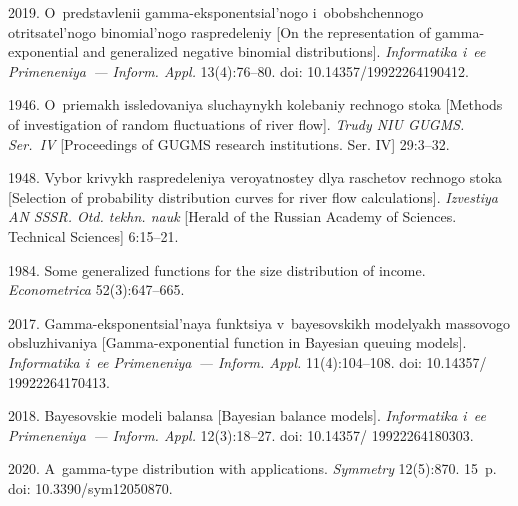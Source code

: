   \begin{multicols}{2}

\renewcommand{\bibname}{\protect\rmfamily References}

{\small\frenchspacing
 {%
 \begin{thebibliography}{99} 

 2019. O~pred\-stav\-le\-nii gamma-eksponentsial'nogo i~obob\-shchen\-no\-go ot\-ri\-tsa\-tel'\-no\-go 
bi\-no\-mi\-al'\-no\-go ras\-pre\-de\-le\-niy 
[On the representation of gamma-exponential and generalized negative binomial distributions]. \textit{Informatika i~ee Primeneniya~--- Inform. Appl.} 13(4):76--80. 
doi: 10.14357/19922264190412.

 1946. O~pri\-emakh is\-sle\-do\-va\-niya slu\-chay\-nykh ko\-le\-ba\-niy rech\-no\-go sto\-ka 
 [Methods of investigation of random fluctuations of river flow]. \textit{Trudy NIU GUGMS. Ser.~IV} [Proceedings of GUGMS research institutions. Ser. IV] 29:3--32.

 1948. Vy\-bor kri\-vykh ras\-pre\-de\-le\-niya ve\-ro\-yat\-no\-stey dlya ra\-sche\-tov rech\-no\-go sto\-ka 
 [Selection of probability distribution curves for river flow calculations]. \textit{Izvestiya AN SSSR. Otd. tekhn. nauk} 
 [Herald of the Russian Academy of Sciences. Technical Sciences] 6:15--21.

 1984. Some generalized functions for the size distribution of income. \textit{Econometrica} 52(3):647--665.

 2017. Gamma-eksponentsial'naya funk\-tsiya v~baye\-sov\-skikh mo\-de\-lyakh mas\-so\-vo\-go ob\-slu\-zhi\-va\-niya 
 [Gamma-exponential function in Bayesian queuing models]. \textit{Informatika i~ee Primeneniya~--- Inform. Appl.} 11(4):104--108. doi: 10.14357/ 19922264170413. 

 2018. Baye\-sov\-skie mo\-de\-li ba\-lan\-sa [Bayesian balance models]. \textit{Informatika i~ee Primeneniya~--- Inform. Appl.} 
12(3):18--27. doi: 10.14357/ 19922264180303.

 2020. A~gamma-type distribution with applications. \textit{Symmetry} 12(5):870. 15~p. doi: 10.3390/sym12050870.


\end{thebibliography}}}
\end{multicols}
